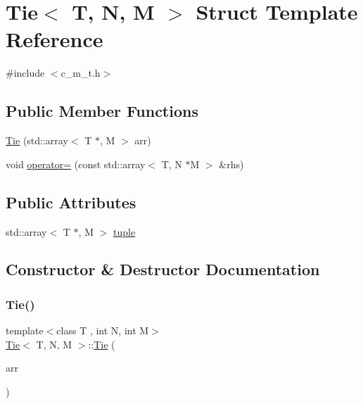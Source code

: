 \hypertarget{structTie}{}\section{Tie$<$ T, N, M $>$ Struct Template Reference}
\label{structTie}


{\ttfamily \#include $<$c\+\_\+m\+\_\+t.\+h$>$}

\subsection*{Public Member Functions}
\begin{DoxyCompactItemize}
\item 
\hyperlink{structTie_a58df4b2dbd5e7e5be53529d0daa89ca1}{Tie} (std\+::array$<$ T $\ast$, M $>$ arr)
\item 
void \hyperlink{structTie_af835eefa6c2e6208589721587d8f743d}{operator=} (const std\+::array$<$ T, N $\ast$M $>$ \&rhs)
\end{DoxyCompactItemize}
\subsection*{Public Attributes}
\begin{DoxyCompactItemize}
\item 
std\+::array$<$ T $\ast$, M $>$ \hyperlink{structTie_a787e11998c210d1f1019ad3aee9adf82}{tuple}
\end{DoxyCompactItemize}


\subsection{Constructor \& Destructor Documentation}
\mbox{\label{structTie_a58df4b2dbd5e7e5be53529d0daa89ca1}} 
\subsubsection{\texorpdfstring{Tie()}{Tie()}}
{\footnotesize\ttfamily template$<$class T , int N, int M$>$ \\
\hyperlink{structTie}{Tie}$<$ T, N, M $>$\+::\hyperlink{structTie}{Tie} (\begin{DoxyParamCaption}\item[{std\+::array$<$ T $\ast$, M $>$}]{arr }\end{DoxyParamCaption})\hspace{0.3cm}{\ttfamily [inline]}}



